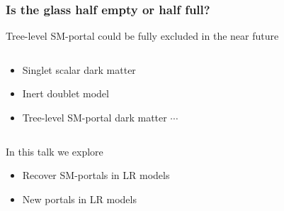 \documentclass[%
xcolor=dvipsnames,table%
]{beamer}
\begin{document}
\begin{frame}
  \frametitle{Is the glass half empty or half full?}
   Tree-level SM-portal could be fully excluded in the near future

  \begin{columns}
    \begin{column}{0.5\textwidth}
      \begin{itemize}
      \item Singlet scalar dark matter
      \item Inert doublet model
      \item Tree-level SM-portal dark matter $\cdots$
      \end{itemize}
    \end{column}
    \begin{column}{0.5\textwidth}


    \end{column}

  \end{columns}

  In this talk we explore
  \begin{itemize}
  \item<2-> Recover SM-portals in LR models 
  \item<3-> New portals in LR models 
  \end{itemize}

\end{frame}
\end{document}
